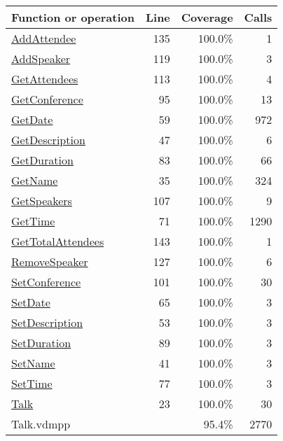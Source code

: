 \bigskip
\begin{longtable}{|l|r|r|r|}
\hline
Function or operation & Line & Coverage & Calls \\
\hline
\hline
\hyperref[AddAttendee:135]{AddAttendee} & 135&100.0\% & 1 \\
\hline
\hyperref[AddSpeaker:119]{AddSpeaker} & 119&100.0\% & 3 \\
\hline
\hyperref[GetAttendees:113]{GetAttendees} & 113&100.0\% & 4 \\
\hline
\hyperref[GetConference:95]{GetConference} & 95&100.0\% & 13 \\
\hline
\hyperref[GetDate:59]{GetDate} & 59&100.0\% & 972 \\
\hline
\hyperref[GetDescription:47]{GetDescription} & 47&100.0\% & 6 \\
\hline
\hyperref[GetDuration:83]{GetDuration} & 83&100.0\% & 66 \\
\hline
\hyperref[GetName:35]{GetName} & 35&100.0\% & 324 \\
\hline
\hyperref[GetSpeakers:107]{GetSpeakers} & 107&100.0\% & 9 \\
\hline
\hyperref[GetTime:71]{GetTime} & 71&100.0\% & 1290 \\
\hline
\hyperref[GetTotalAttendees:143]{GetTotalAttendees} & 143&100.0\% & 1 \\
\hline
\hyperref[RemoveSpeaker:127]{RemoveSpeaker} & 127&100.0\% & 6 \\
\hline
\hyperref[SetConference:101]{SetConference} & 101&100.0\% & 30 \\
\hline
\hyperref[SetDate:65]{SetDate} & 65&100.0\% & 3 \\
\hline
\hyperref[SetDescription:53]{SetDescription} & 53&100.0\% & 3 \\
\hline
\hyperref[SetDuration:89]{SetDuration} & 89&100.0\% & 3 \\
\hline
\hyperref[SetName:41]{SetName} & 41&100.0\% & 3 \\
\hline
\hyperref[SetTime:77]{SetTime} & 77&100.0\% & 3 \\
\hline
\hyperref[Talk:23]{Talk} & 23&100.0\% & 30 \\
\hline
\hline
Talk.vdmpp & & 95.4\% & 2770 \\
\hline
\end{longtable}

